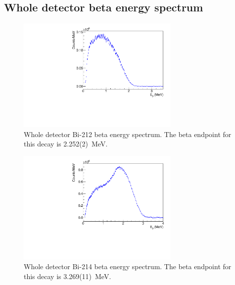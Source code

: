 \subsection{Whole detector beta energy spectrum}
\begin{figure}[!h]
\centering
\includegraphics[width=0.7\textwidth]{figures/PubBiPo212BetaE.pdf}
\caption{\label{fig:BetaE212}Whole detector Bi-212 beta energy spectrum. The beta endpoint for this decay is 2.252(2)~MeV.}
\end{figure}
\begin{figure}[!h]
\centering
\includegraphics[width=0.7\textwidth]{figures/PubBiPo214BetaE.pdf}
\caption{\label{fig:BetaE214}Whole detector Bi-214 beta energy spectrum. The beta endpoint for this decay is 3.269(11)~MeV.}
\end{figure}
\newpage
